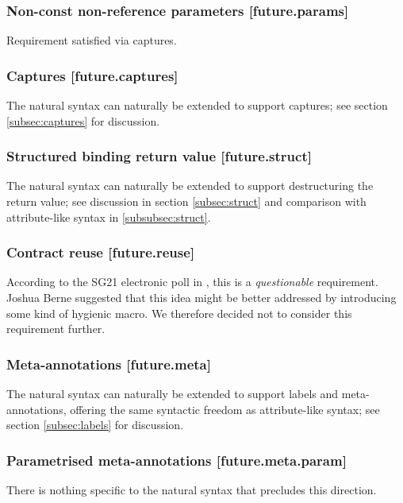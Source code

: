 \subsubsection{Non-const non-reference parameters  [future.params]}

Requirement satisfied via captures.

\subsubsection{Captures  [future.captures]}

The natural syntax can naturally be extended to support captures; see section \ref{subsec:captures} for discussion.

\subsubsection{Structured binding return value  [future.struct]}

The natural syntax can naturally be extended to support destructuring the return value; see discussion in section \ref{subsec:struct} and comparison with attribute-like syntax in \ref{subsubsec:struct}.

\subsubsection{Contract reuse  [future.reuse]}

According to the SG21 electronic poll in \cite{P2885R3}, this is a \emph{questionable} requirement. Joshua Berne suggested that this idea might be better addressed by introducing some kind of hygienic macro. We therefore decided not to consider this requirement further.

\subsubsection{Meta-annotations  [future.meta]}

The natural syntax can naturally be extended to support labels and meta-annotations, offering the same syntactic freedom as attribute-like syntax; see section \ref{subsec:labels} for discussion.

\subsubsection{Parametrised meta-annotations  [future.meta.param]}

There is nothing specific to the natural syntax that precludes this direction.

